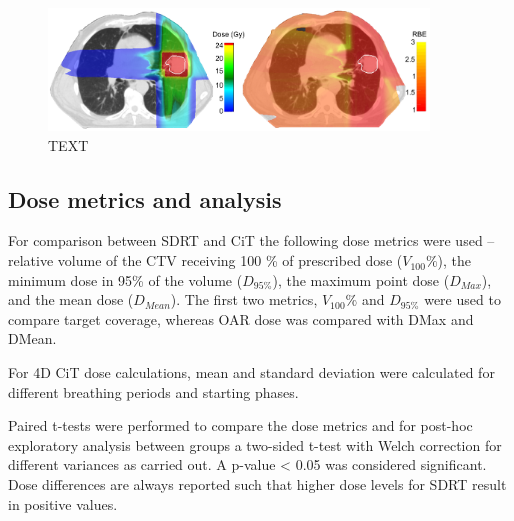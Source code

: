 \documentclass[type=dr, dr=rernat, accentcolor=tud7b,colorbacktitle, bigchapter, openright, twoside, 12pt ]{tudthesis}
\begin{document}
\begin{figure}[H]
\begin{center}
\includegraphics[width=0.9\textwidth]{./Images/RBE.png}
\caption{TEXT}
\label{RegistrationCompare}
\end{center}
\end{figure}

\subsection{Dose metrics and analysis}

For comparison between SDRT and CiT the following dose metrics were used – relative volume of the CTV receiving 100 \% of prescribed dose ($V_{100}\%$), 
the minimum dose in 95\% of the volume ($D_{95\%}$), the maximum point dose ($D_{Max}$), and the mean dose ($D_{Mean}$). The first two metrics, $V_{100}\%$ and $D_{95\%}$ were used 
to compare target coverage, whereas OAR dose was compared with DMax and DMean.

For 4D CiT dose calculations, mean and standard deviation were calculated for different breathing periods and starting phases.

Paired t-tests were performed to compare the dose metrics and for post-hoc exploratory analysis between groups a two-sided t-test with Welch correction for different variances
as carried out. A p-value < 0.05 was considered significant. Dose differences are always reported such that higher dose levels for SDRT result in positive values.


{}
\end{document}
